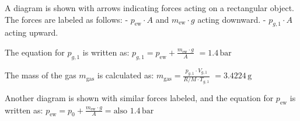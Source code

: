 A diagram is shown with arrows indicating forces acting on a rectangular object. The forces are labeled as follows:  
- \( p_{\text{ew}} \cdot A \) and \( m_{\text{ew}} \cdot g \) acting downward.  
- \( p_{g,1} \cdot A \) acting upward.  

The equation for \( p_{g,1} \) is written as:  
\( p_{g,1} = p_{\text{ew}} + \frac{m_{\text{ew}} \cdot g}{A} \)  
\( = 1.4 \, \text{bar} \)  

The mass of the gas \( m_{\text{gas}} \) is calculated as:  
\( m_{\text{gas}} = \frac{p_{g,1} \cdot V_{g,1}}{R / M \cdot T_{g,1}} \)  
\( = 3.4224 \, \text{g} \)  

Another diagram is shown with similar forces labeled, and the equation for \( p_{\text{ew}} \) is written as:  
\( p_{\text{ew}} = p_0 + \frac{m_{\text{ew}} \cdot g}{A} = \text{also } 1.4 \, \text{bar} \)